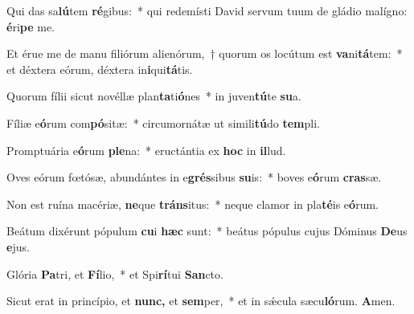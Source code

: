 \item Qui das sa\textbf{lú}tem \textbf{ré}gibus:~* qui redemísti David servum tuum de gládio malígno: \textbf{é}ri\textbf{pe} me.
\item Et érue me de manu filiórum alienórum,~† quorum os locútum est \textbf{va}ni\textbf{tá}tem:~* et déxtera eórum, déxtera in\textbf{i}qui\textbf{tá}tis.
\item Quorum fílii sicut novéllæ plan\textbf{ta}ti\textbf{ó}nes~* in juven\textbf{tú}te \textbf{su}a.
\item Fíliæ e\textbf{ó}rum com\textbf{pó}sitæ:~* circumornátæ ut simili\textbf{tú}do \textbf{tem}pli.
\item Promptuária e\textbf{ó}rum \textbf{ple}na:~* eructántia ex \textbf{hoc} in \textbf{il}lud.
\item Oves eórum fœtósæ, abundántes in e\textbf{grés}sibus \textbf{su}is:~* boves e\textbf{ó}rum \textbf{cras}sæ.
\item Non est ruína macériæ, \textbf{ne}que \textbf{tráns}itus:~* neque clamor in pla\textbf{té}is e\textbf{ó}rum.
\item Beátum dixérunt pópulum \textbf{cu}i \textbf{hæc} sunt:~* beátus pópulus cujus Dóminus \textbf{De}us \textbf{e}jus.
\item Glória \textbf{Pa}tri, et \textbf{Fí}lio,~* et Spi\textbf{rí}tui \textbf{San}cto.
\item Sicut erat in princípio, et \textbf{nunc,} et \textbf{sem}per,~* et in sǽcula sæcu\textbf{ló}rum. \textbf{A}men.